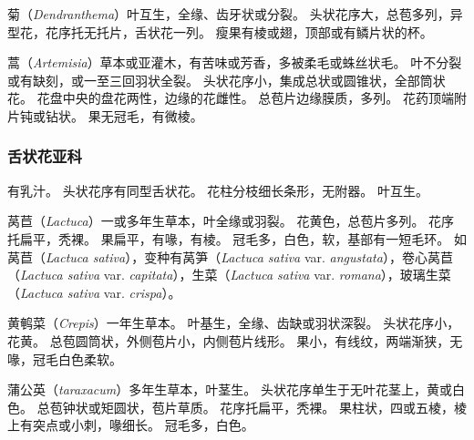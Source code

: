 \documentclass[11pt]{article}
\begin{document}
\begin{sloppypar}
\par

菊（\textit{Dendranthema}）叶互生，全缘、齿牙状或分裂。
头状花序大，总苞多列，异型花，花序托无托片，舌状花一列。
瘦果有棱或翅，顶部或有鳞片状的杯。

\par

蒿（\textit{Artemisia}）草本或亚灌木，有苦味或芳香，多被柔毛或蛛丝状毛。
叶不分裂或有缺刻，或一至三回羽状全裂。
头状花序小，集成总状或圆锥状，全部筒状花。
花盘中央的盘花两性，边缘的花雌性。
总苞片边缘膜质，多列。
花药顶端附片钝或钻状。
果无冠毛，有微棱。

\subsubsection{舌状花亚科}
有乳汁。
头状花序有同型舌状花。
花柱分枝细长条形，无附器。
叶互生。

\par

莴苣（\textit{Lactuca}）一或多年生草本，叶全缘或羽裂。
花黄色，总苞片多列。
花序托扁平，秃裸。
果扁平，有喙，有棱。
冠毛多，白色，软，基部有一短毛环。
如莴苣（\textit{Lactuca sativa}），变种有莴笋（\textit{Lactuca sativa} var. \textit{angustata}），卷心莴苣（\textit{Lactuca sativa} var. \textit{capitata}），生菜（\textit{Lactuca sativa} var. \textit{romana}），玻璃生菜（\textit{Lactuca sativa} var. \textit{crispa}）。

\par

黄鹌菜（\textit{Crepis}）一年生草本。
叶基生，全缘、齿缺或羽状深裂。
头状花序小，花黄。
总苞圆筒状，外侧苞片小，内侧苞片线形。
果小，有线纹，两端渐狭，无喙，冠毛白色柔软。

\par

蒲公英（\textit{taraxacum}）多年生草本，叶茎生。
头状花序单生于无叶花茎上，黄或白色。
总苞钟状或矩圆状，苞片草质。
花序托扁平，秃裸。
果柱状，四或五棱，棱上有突点或小刺，喙细长。
冠毛多，白色。

\end{sloppypar}
\end{document}
